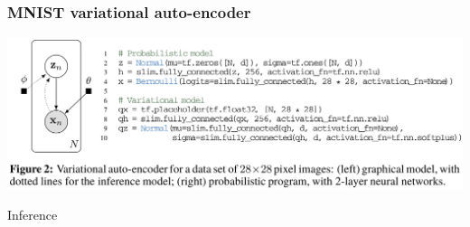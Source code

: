 \documentclass[10pt]{beamer}
\begin{document}
\begin{frame}
  \frametitle{MNIST variational auto-encoder}
  \includegraphics[width=\textwidth]{img/edward-vae.png}

  \begin{block}{Inference}
    \inputminted{python}{python/vae-inference.py}
  \end{block}
\end{frame}
\end{document}
